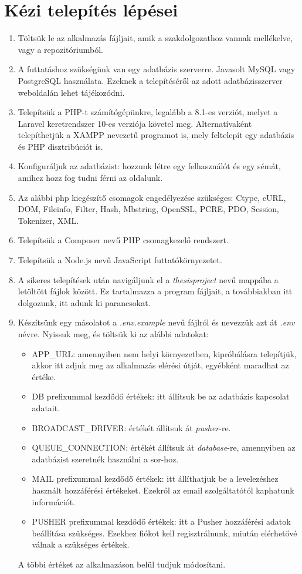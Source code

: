 \documentclass[
]{thesis-ekf}
\theoremstyle{definition}
\theoremstyle{remark}
\begin{document}
\section{Kézi telepítés lépései}
\label{manualSetup}
\begin{enumerate}
	\item Töltsük le az alkalmazás fájljait, amik a szakdolgozathoz vannak mellékelve, vagy a repozitóriumból.
	\item A futtatáshoz szükségünk van egy adatbázis szerverre. Javasolt MySQL\cite{mysql} vagy PostgreSQL\cite{postgre} használata. Ezeknek a telepítéséről az adott adatbázisszerver weboldalán lehet tájékozódni.
	\item Telepítsük a PHP-t számítógépünkre, legalább a 8.1-es verziót, melyet a Laravel keretrendszer 10-es verziója követel meg. Alternatívaként telepíthetjük a XAMPP\cite{xampp} nevezetű programot is, mely feltelepít egy adatbázis és PHP disztribúciót is.
	\item Konfiguráljuk az adatbázist: hozzunk létre egy felhasználót és egy sémát, amihez hozz fog tudni férni az oldalunk.
	\item Az alábbi php kiegészítő csomagok engedélyezése szükséges: Ctype, cURL, DOM, Fileinfo, Filter, Hash, Mbstring, OpenSSL, PCRE, PDO, Session, Tokenizer, XML.
	\item Telepítsük a Composer\cite{composer} nevű PHP csomagkezelő rendszert.
	\item Telepítsük a Node.js\cite{nodejs} nevű JavaScript futtatókörnyezetet.
	\item A sikeres telepítések után navigáljunk el a \emph{thesisproject} nevű mappába a letöltött fájlok között. Ez tartalmazza a program fájljait, a továbbiakban itt dolgozunk, itt adunk ki parancsokat.
	\item Készítsünk egy másolatot a \emph{.env.example} nevű fájlról és nevezzük azt át \emph{.env} névre. Nyissuk meg, és töltsük ki az alábbi adatokat:
	\begin{itemize}
		\item APP\_URL: amennyiben nem helyi környezetben, kipróbálásra telepítjük, akkor itt adjuk meg az alkalmazás elérési útját, egyébként maradhat az értéke.
		\item DB prefixummal kezdődő értékek: itt állítsuk be az adatbázis kapcsolat adatait.
		\item BROADCAST\_DRIVER: értékét állítsuk át \emph{pusher}-re.
		\item QUEUE\_CONNECTION: értékét állítsuk át \emph{database}-re, amennyiben az adatbázist szeretnék használni a sor-hoz.
		\item MAIL prefixummal kezdődő értékek: itt állíthatjuk be a levelezéshez használt hozzáférési értékeket. Ezekről az email szolgáltatótól kaphatunk információt.
		\item PUSHER prefixummal kezdődő értékek: itt a Pusher hozzáférési adatok beállítása szükséges. Ezekhez fiókot kell regisztrálnunk, miután elérhetővé válnak a szükséges értékek. 
	\end{itemize}
	A többi értéket az alkalmazáson belül tudjuk módosítani.


\end{enumerate}
\end{document}
